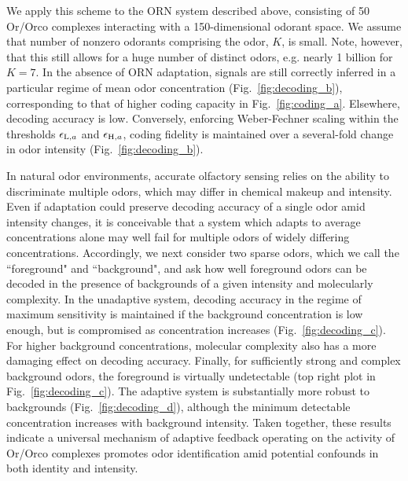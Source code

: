 We apply this scheme to the ORN system described above, consisting of 50 Or/Orco complexes interacting with a 150-dimensional odorant space. We assume that number of nonzero odorants comprising the odor, $K$, is small. Note, however, that this still allows for a huge number of distinct odors, e.g. nearly 1 billion for $K= 7$. In the absence of ORN adaptation, signals are still correctly inferred in a particular regime of mean odor concentration (Fig.~\ref{fig:decoding_b}), corresponding to that of higher coding capacity in Fig.~\ref{fig:coding_a}.  Elsewhere, decoding accuracy is low. Conversely, enforcing Weber-Fechner scaling within the thresholds  $\epsilon_{\textup{L}, a}$ and $\epsilon_{\textup{H}, a}$, coding fidelity is  maintained over a several-fold change in odor intensity (Fig.~\ref{fig:decoding_b}).

In natural odor environments, accurate olfactory sensing relies on the ability to discriminate multiple odors, which may differ in chemical makeup and intensity. Even if adaptation could preserve decoding accuracy of a single odor amid intensity changes, it is conceivable that a system which adapts to average concentrations alone may well fail for multiple odors of widely differing concentrations. Accordingly,  we next consider two sparse odors, which we call the ``foreground" and ``background", and ask how well foreground odors can be decoded in the presence of backgrounds of a given intensity and molecularly complexity. In the unadaptive system, decoding accuracy in the regime of maximum sensitivity is maintained if the background concentration is low enough, but is  compromised as concentration increases (Fig.~\ref{fig:decoding_c}). For higher background concentrations, molecular complexity also has a more damaging effect on decoding accuracy. Finally, for sufficiently strong and complex background odors, the foreground is virtually undetectable (top right plot in Fig.~\ref{fig:decoding_c}). The adaptive system is substantially more robust to  backgrounds (Fig.~\ref{fig:decoding_d}), although the minimum detectable concentration increases with background intensity. Taken together, these results indicate a universal mechanism of adaptive  feedback operating on the activity of Or/Orco complexes promotes odor identification  amid potential confounds in both identity and intensity.





